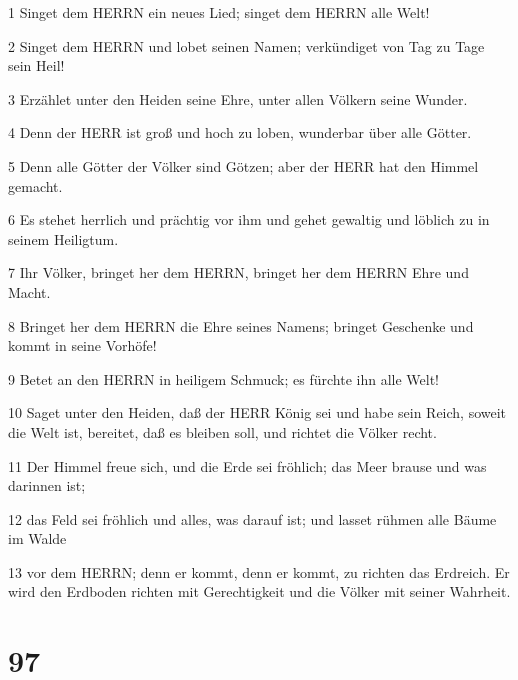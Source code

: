 \par 1 Singet dem HERRN ein neues Lied; singet dem HERRN alle Welt!
\par 2 Singet dem HERRN und lobet seinen Namen; verkündiget von Tag zu Tage sein Heil!
\par 3 Erzählet unter den Heiden seine Ehre, unter allen Völkern seine Wunder.
\par 4 Denn der HERR ist groß und hoch zu loben, wunderbar über alle Götter.
\par 5 Denn alle Götter der Völker sind Götzen; aber der HERR hat den Himmel gemacht.
\par 6 Es stehet herrlich und prächtig vor ihm und gehet gewaltig und löblich zu in seinem Heiligtum.
\par 7 Ihr Völker, bringet her dem HERRN, bringet her dem HERRN Ehre und Macht.
\par 8 Bringet her dem HERRN die Ehre seines Namens; bringet Geschenke und kommt in seine Vorhöfe!
\par 9 Betet an den HERRN in heiligem Schmuck; es fürchte ihn alle Welt!
\par 10 Saget unter den Heiden, daß der HERR König sei und habe sein Reich, soweit die Welt ist, bereitet, daß es bleiben soll, und richtet die Völker recht.
\par 11 Der Himmel freue sich, und die Erde sei fröhlich; das Meer brause und was darinnen ist;
\par 12 das Feld sei fröhlich und alles, was darauf ist; und lasset rühmen alle Bäume im Walde
\par 13 vor dem HERRN; denn er kommt, denn er kommt, zu richten das Erdreich. Er wird den Erdboden richten mit Gerechtigkeit und die Völker mit seiner Wahrheit.

\chapter{97}

